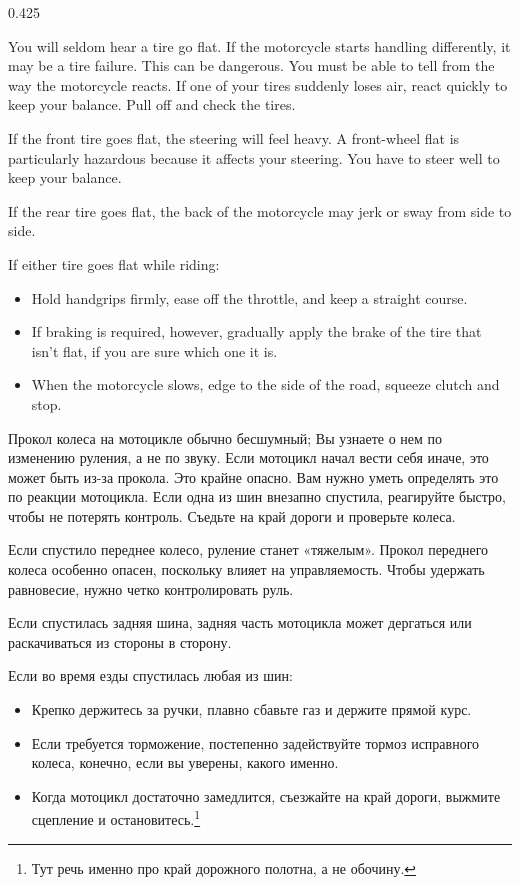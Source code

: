 \begin{langblock}{0.425}
	\begin{eng}
	
	You will seldom hear a tire go flat. If the motorcycle starts handling differently, it may be a tire failure.  This can be dangerous. You must be able to tell from the way the motorcycle reacts. If one of your tires suddenly loses air, react quickly to keep your balance. Pull off and check the tires.
	
	If the front tire goes flat, the steering will feel heavy. A front-wheel flat is particularly hazardous because it affects your steering. You have to steer well to keep your balance.
	
	If the rear tire goes flat, the back of the motorcycle may jerk or sway from side to side.
	
	If either tire goes flat while riding:
	\begin{itemize}[noitemsep]
		\item Hold handgrips firmly, ease off the throttle, and keep a straight course.
		\item If braking is required, however, gradually apply the brake of the tire that isn't flat, if you are sure which one it is.
		\item When the motorcycle slows, edge to the side of the road, squeeze clutch and stop.
	\end{itemize}
	\end{eng}
	\begin{rus}
		
		Прокол колеса на мотоцикле обычно бесшумный; Вы узнаете о нем по изменению руления, а не по звуку. Если мотоцикл начал вести себя иначе, это может быть из-за прокола.  Это крайне опасно. Вам нужно уметь определять это по реакции мотоцикла. Если одна из шин внезапно спустила, реагируйте быстро, чтобы не потерять контроль. Съедьте на край дороги и проверьте колеса.
		
		Если спустило переднее колесо, руление станет «тяжелым». Прокол переднего колеса особенно опасен, поскольку влияет на управляемость. Чтобы удержать равновесие, нужно четко контролировать руль.
		
		Если спустилась задняя шина, задняя часть мотоцикла может дергаться или раскачиваться из стороны в сторону.
		
		Если во время езды спустилась любая из шин:
		
		\begin{itemize}[noitemsep]
			\item Крепко держитесь за ручки, плавно сбавьте газ и держите прямой курс.
			\item Если требуется торможение, постепенно задействуйте тормоз исправного колеса, конечно, если вы уверены, какого именно.
			\item Когда мотоцикл достаточно замедлится, съезжайте на край дороги, выжмите сцепление и остановитесь.\footnote{Тут речь именно про край дорожного полотна, а не обочину.}
		\end{itemize}
\end{rus}
\end{langblock}


